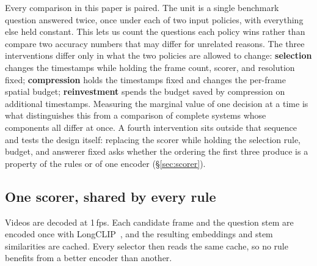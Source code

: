 \documentclass[11pt]{article}
\begin{document}
Every comparison in this paper is paired.
The unit is a single benchmark question answered twice, once under each of two input policies, with everything else held constant.
This lets us count the questions each policy wins rather than compare two accuracy numbers that may differ for unrelated reasons.
The three interventions differ only in what the two policies are allowed to change:
\textbf{selection} changes the timestamps while holding the frame count, scorer, and resolution fixed;
\textbf{compression} holds the timestamps fixed and changes the per-frame spatial budget;
\textbf{reinvestment} spends the budget saved by compression on additional timestamps.
Measuring the marginal value of one decision at a time is what distinguishes this from a comparison of complete systems whose components all differ at once.
A fourth intervention sits outside that sequence and tests the design itself: replacing the scorer while holding the selection rule, budget, and answerer fixed asks whether the ordering the first three produce is a property of the rules or of one encoder (\S\ref{sec:scorer}).

\subsection{One scorer, shared by every rule}

Videos are decoded at 1\,fps.
Each candidate frame and the question stem are encoded once with LongCLIP~\citep{zhang2024longclip}, and the resulting embeddings and stem similarities are cached.
Every selector then reads the same cache, so no rule benefits from a better encoder than another.
\end{document}
